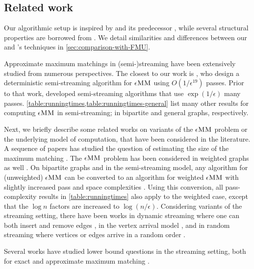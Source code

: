 \documentclass{article}
\newcommand{\eps}{\epsilon}
\newcommand{\eMM}{\eps\textsc{MM}}
\begin{document}
\subsection{Related work} \label{sec:related-work}
Our algorithmic setup is inspired by \cite{FMU22} and its predecessor \cite{eggert2012bipartite}, while several structural properties are borrowed from \cite{edmonds1965paths}. We detail similarities and differences between our and \cite{FMU22}'s techniques in \cref{sec:comparison-with-FMU}.

Approximate maximum matchings in (semi-)streaming have been extensively studied from numerous perspectives.
The closest to our work is \cite{FMU22}, who design a deterministic semi-streaming algorithm for $\eMM$ using $O(1/\eps^{19})$ passes. Prior to that work, \cite{mcgregor2005finding,tirodkar2018deterministic} developed semi-streaming algorithms that use $\exp(1/\eps)$ many passes. \cref{table:runningtimes,table:runningtimes-general} list many other results for computing $\eMM$ in semi-streaming; in bipartite and general graphs, respectively.

Next, we briefly describe some related works on variants of the $\eMM$ problem or the underlying model of computation, that have been considered in the literature. 
A sequence of papers has studied the question of estimating the size of the maximum matching \cite{KapralovKS14,BuryS15,AssadiKL17,EsfandiariHLMO18,KapralovMNT20}. The $\eMM$ problem has been considered in weighted graphs as well \cite{ahn2011laminar,ahn2013linear,BuryS15,ahn2018access, gamlath2019weighted,huang2023,assadi2024simple}. 
On bipartite graphs and in the semi-streaming model, any algorithm for (unweighted) $\eMM$ can be converted to an algorithm for weighted $\eMM$ with slightly increased pass and space complexities \cite{Bernstein2021,Bernstein2025}.
Using this conversion, all pass-complexity results in \cref{table:runningtimes} also apply to the weighted case, except that the $\log n$ factors are increased to $\log(n / \eps)$.
Considering variants of the streaming setting, there have been works in dynamic streaming where one can both insert and remove edges \cite{Konrad15, BuryS15, ChitnisCEHMMV16,AssadiKLY16}, in the vertex arrival model \cite{KarpVV90,GoelKK12,kapralov2013better,EpsteinLSW13, ChiplunkarTV15,BuchbinderST19,GamlathKMSW19}, and in random streaming where vertices or edges arrive in a random order \cite{MahdianY11,KonradMM12,gamlath2019weighted,FarhadiHMRR20,Bernstein20,AssadiB21}. 

Several works have studied lower bound questions in the streaming setting, both for exact \cite{GuruswamiO16,AssadiR20,ChenKPS0Y21} and approximate maximum matching \cite{GoelKK12,kapralov2013better,AssadiKLY16,AssadiKL17,AssadiKSY20,Kapralov21,Assadi22,AssadiS23}. 
\end{document}
